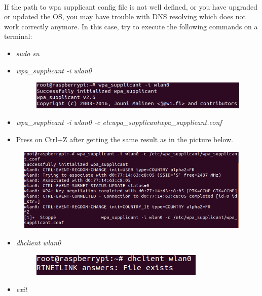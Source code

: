 \documentclass[12pt]{report}
\begin{document}
	\paragraph{}
	If the path to wpa supplicant config file is not well defined, or you have upgraded or updated the OS, you may have trouble with DNS resolving which does not work correctly anymore. 
	In this case, try to execute the following commands on a terminal:
	\begin{itemize}
		\item \textit{sudo su}
		\item \textit{wpa\_supplicant -i wlan0}
		\begin{figure}[H]
			\begin{center}
				\includegraphics[scale=0.6]{res/dns3.png}
			\end{center}
		\end{figure}
		\item \textit{wpa\_supplicant -i wlan0 -c \/etc\/wpa\_supplicant\/wpa\_supplicant.conf}
		\item Press on Ctrl+Z after getting the same result as in the picture below.
	\end{itemize}
\begin{figure}[H]
	\begin{center}
		\includegraphics[scale=0.6]{res/dns1.png}
	\end{center}
\end{figure}
\begin{itemize}
	\item \textit{dhclient wlan0}
	\begin{figure}[H]
		\begin{center}
			\includegraphics[scale=0.6]{res/dns2.png}
		\end{center}
	\end{figure}
	\item \textit{exit}
\end{itemize}
\end{document}
